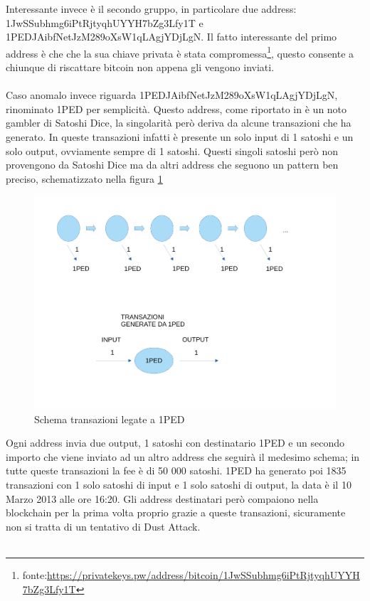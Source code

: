 Interessante invece è il secondo gruppo, in particolare due address: 1JwSSubhmg6iPtRjtyqhUYYH7bZg3Lfy1T e 1PEDJAibfNetJzM289oXsW1qLAgjYDjLgN. Il fatto interessante del primo address è che che la sua chiave privata è stata compromessa\footnote{fonte:\url{https://privatekeys.pw/address/bitcoin/1JwSSubhmg6iPtRjtyqhUYYH7bZg3Lfy1T}}, questo consente a chiunque di riscattare bitcoin non appena gli vengono inviati.\\\\
Caso anomalo invece riguarda 1PEDJAibfNetJzM289oXsW1qLAgjYDjLgN, rinominato 1PED per semplicità. Questo address, come riportato in\cite{dustAnalisi} è un noto gambler di Satoshi Dice, la singolarità però deriva da alcune transazioni che ha generato. In queste transazioni infatti è presente un solo input di 1 satoshi e un solo output, ovviamente sempre di 1 satoshi. Questi singoli satoshi però non provengono da Satoshi Dice ma da altri address che seguono un pattern ben preciso, schematizzato nella figura \ref{fig:1PED}
\begin{figure}[h!]
    \centering
    \includegraphics[scale=0.4]{Images/1Ped.pdf}
    \caption{Schema transazioni legate a 1PED}
    \label{fig:1PED}
\end{figure}
\FloatBarrier
Ogni address invia due output, 1 satoshi con destinatario 1PED e un secondo importo che viene inviato ad un altro address che seguirà il medesimo schema; in tutte queste transazioni la fee è di 50 000 satoshi. 1PED ha generato poi 1835 transazioni con 1 solo satoshi di input e 1 solo satoshi di output, la data è il 10 Marzo 2013 alle ore 16:20. Gli address destinatari però compaiono nella blockchain per la prima volta proprio grazie a queste transazioni, sicuramente non si tratta di un tentativo di Dust Attack.\\\\
